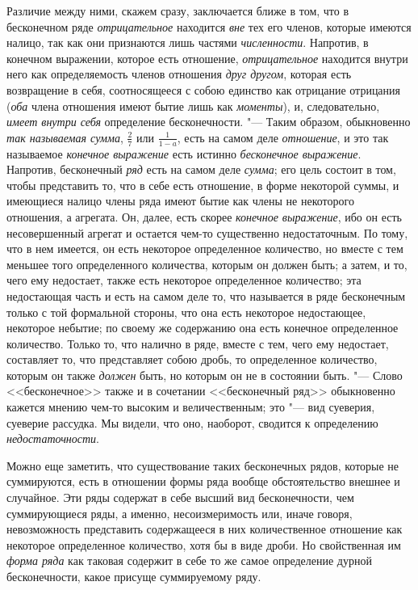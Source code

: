 Различие между ними, скажем сразу, заключается ближе в том, что в
бесконечном ряде {\em отрицательное} находится
{\em вне} тех его членов, которые имеются налицо, так
как они признаются лишь частями {\em численности}.
Напротив, в конечном выражении, которое есть отношение,
{\em отрицательное} находится внутри него как
определяемость членов отношения {\em друг другом},
которая есть возвращение в себя, соотносящееся с собою единство как
отрицание отрицания ({\em оба} члена отношения имеют
бытие лишь как {\em моменты}), и, следовательно,
{\em имеет внутри себя} определение бесконечности. "---
Таким образом, обыкновенно {\em так называемая сумма}, 
$\frac 2 7$ или $\frac 1{1-a}$, есть на самом деле
{\em отношение}, и это так называемое {\em конечное выражение} есть истинно
{\em бесконечное выражение}. Напротив, бесконечный {\em ряд} есть на самом
деле {\em сумма}; его цель состоит в том, чтобы представить
то, что в себе есть отношение, в форме некоторой суммы, и имеющиеся налицо
члены ряда имеют бытие как члены не некоторого отношения, а агрегата. Он,
далее, есть скорее {\em конечное выражение}, ибо он
есть несовершенный агрегат и остается чем-то существенно недостаточным. По
тому, что в нем имеется, он есть некоторое определенное количество, но
вместе с тем меньшее того определенного количества, которым он должен быть;
а затем, и то, чего ему недостает, также есть некоторое определенное
количество; эта недостающая часть и есть на самом деле то, что называется в
ряде бесконечным только с той формальной стороны, что она есть некоторое
недостающее, некоторое небытие; по своему же содержанию она есть конечное
определенное количество. Только то, что налично в ряде, вместе с тем, чего
ему недостает, составляет то, что представляет собою дробь, то определенное
количество, которым он также {\em должен} быть, но
которым он не в состоянии быть. "--- Слово <<бесконечное>> также и в сочетании
<<бесконечный ряд>> обыкновенно кажется мнению чем-то высоким и
величественным; это "--- вид суеверия, суеверие рассудка. Мы видели, что оно,
наоборот, сводится к определению {\em недостаточности}.

Можно еще заметить, что существование таких бесконечных рядов, которые не
суммируются, есть в отношении формы ряда вообще обстоятельство внешнее и
случайное. Эти ряды содержат в себе высший вид бесконечности, чем
суммирующиеся ряды, а именно, несоизмеримость или, иначе говоря,
невозможность представить содержащееся в них количественное отношение как
некоторое определенное количество, хотя бы в виде дроби. Но свойственная им
{\em форма ряда} как таковая содержит в себе то же
самое определение дурной бесконечности, какое присуще суммируемому ряду.

